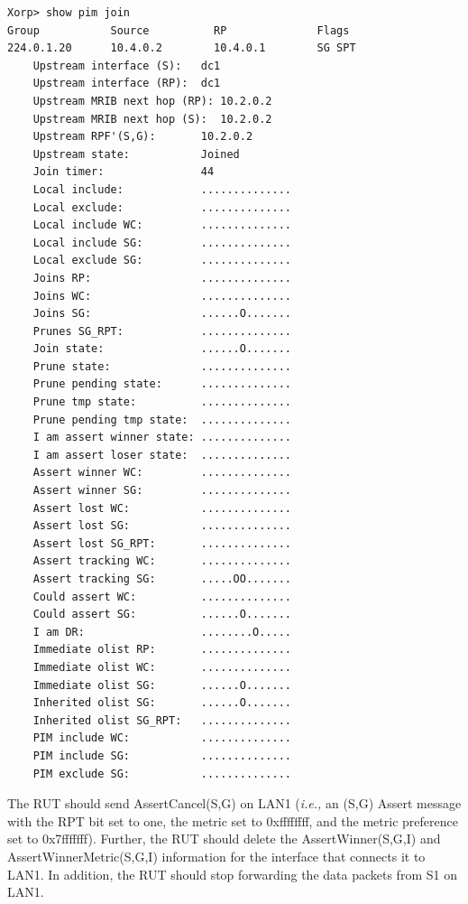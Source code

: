 \documentclass[11pt]{report}
\newcommand{\ie}{\emph{i.e.,}\xspace}
\begin{document}
\begin{itemize}
\begin{verbatim}
Xorp> show pim join 
Group           Source          RP              Flags
224.0.1.20      10.4.0.2        10.4.0.1        SG SPT 
    Upstream interface (S):   dc1
    Upstream interface (RP):  dc1
    Upstream MRIB next hop (RP): 10.2.0.2
    Upstream MRIB next hop (S):  10.2.0.2
    Upstream RPF'(S,G):       10.2.0.2
    Upstream state:           Joined 
    Join timer:               44
    Local include:            ..............
    Local exclude:            ..............
    Local include WC:         ..............
    Local include SG:         ..............
    Local exclude SG:         ..............
    Joins RP:                 ..............
    Joins WC:                 ..............
    Joins SG:                 ......O.......
    Prunes SG_RPT:            ..............
    Join state:               ......O.......
    Prune state:              ..............
    Prune pending state:      ..............
    Prune tmp state:          ..............
    Prune pending tmp state:  ..............
    I am assert winner state: ..............
    I am assert loser state:  ..............
    Assert winner WC:         ..............
    Assert winner SG:         ..............
    Assert lost WC:           ..............
    Assert lost SG:           ..............
    Assert lost SG_RPT:       ..............
    Assert tracking WC:       ..............
    Assert tracking SG:       .....OO.......
    Could assert WC:          ..............
    Could assert SG:          ......O.......
    I am DR:                  ........O.....
    Immediate olist RP:       ..............
    Immediate olist WC:       ..............
    Immediate olist SG:       ......O.......
    Inherited olist SG:       ......O.......
    Inherited olist SG_RPT:   ..............
    PIM include WC:           ..............
    PIM include SG:           ..............
    PIM exclude SG:           ..............
\end{verbatim}

  The RUT should send AssertCancel(S,G) on LAN1 (\ie an (S,G) Assert message
  with the RPT bit set to one, the metric set to 0xffffffff, and the
  metric preference set to 0x7fffffff).
  Further, the RUT should delete the AssertWinner(S,G,I) and
  AssertWinnerMetric(S,G,I) information for the interface that connects it to
  LAN1.
  In addition, the RUT should stop forwarding the data packets from S1 on LAN1.

\end{itemize}
\end{document}
